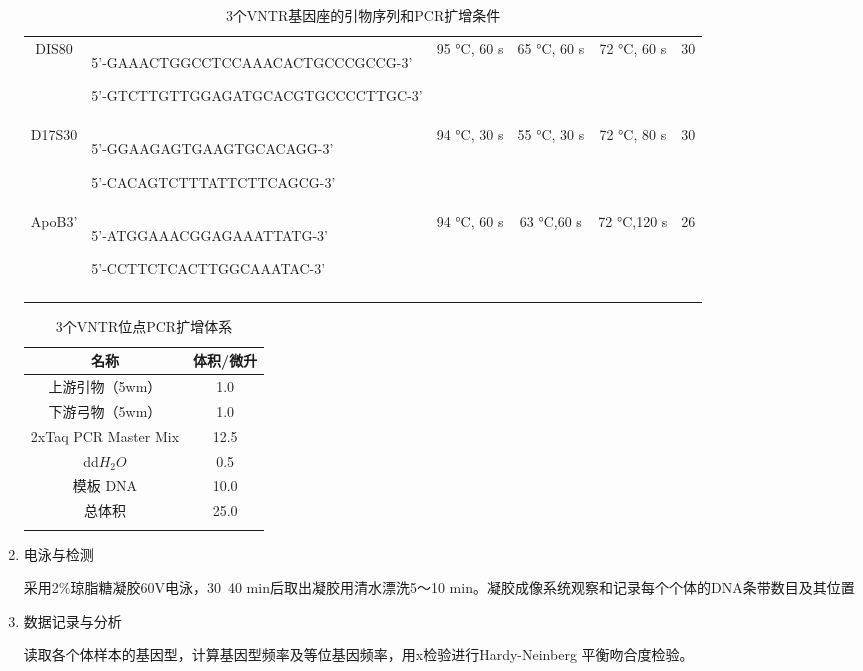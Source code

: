 \documentclass[AutoFakeBold]{LZUThesis}
\begin{document}
\begin{enumerate}
\begin{longtable}{c|p{4.7cm}cccc}
        \midrule
        DIS80 & \centering \tiny 5'-GAAACTGGCCTCCAAACACTGCCCGCCG-3'\par 5'-GTCTTGTTGGAGATGCACGTGCCCCTTGC-3' & 95 °C, 60 s & 65 °C, 60 s & 72 °C, 60 s & 30 \\
        D17S30 & \centering \tiny 5'-GGAAGAGTGAAGTGCACAGG-3'\par 5'-CACAGTCTTTATTCTTCAGCG-3' & 94 °C, 30 s & 55 °C, 30 s & 72 °C, 80 s & 30 \\
        ApoB3' & \centering \tiny 5'-ATGGAAACGGAGAAATTATG-3'\par 5'-CCTTCTCACTTGGCAAATAC-3' & 94 °C, 60 s & 63 °C,60 s & 72 °C,120 s & 26 \\
        \bottomrule
        \caption{3个VNTR基因座的引物序列和PCR扩增条件}
        \label{tab:table1} \\
    \end{longtable}

    \begin{longtable}{cc}
        \toprule
        名称 & 体积/微升 \\
        \midrule
        上游引物（5wm） & 1.0 \\
        下游弓物（5wm） & 1.0 \\
        2xTaq PCR Master Mix & 12.5 \\
        dd$H_2O$ & 0.5 \\
        模板 DNA & 10.0 \\
        总体积 & 25.0 \\
        \bottomrule
        \caption{3个VNTR位点PCR扩增体系}
        \label{tab:table2} \\
    \end{longtable}

    \item 电泳与检测\par
    采用2\%琼脂糖凝胶60V电泳，30~40 min后取出凝胶用清水漂洗5～10 min。凝胶成像系统观察和记录每个个体的DNA条带数目及其位置\par
    \item 数据记录与分析\par
    读取各个体样本的基因型，计算基因型频率及等位基因频率，用x检验进行Hardy-Neinberg 平衡吻合度检验。\par
\end{enumerate}
\end{document}
